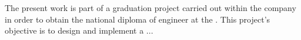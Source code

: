 \sloppy

The present work is part of a graduation project carried out within the company  in order to obtain the national diploma of engineer at the \IMIE. This project's objective is to design and implement a ... \\


